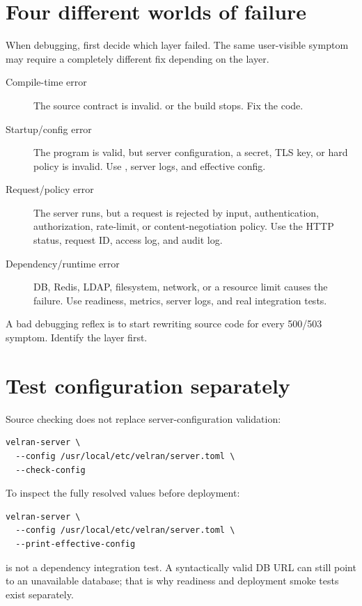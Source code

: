 \section{Four different worlds of failure}

When debugging, first decide which layer failed. The same user-visible symptom may require a completely different fix depending on the layer.

\begin{description}
  \item[Compile-time error] The source contract is invalid.  or the build stops. Fix the code.
  \item[Startup/config error] The program is valid, but server configuration, a secret, TLS key, or hard policy is invalid. Use , server logs, and effective config.
  \item[Request/policy error] The server runs, but a request is rejected by input, authentication, authorization, rate-limit, or content-negotiation policy. Use the HTTP status, request ID, access log, and audit log.
  \item[Dependency/runtime error] DB, Redis, LDAP, filesystem, network, or a resource limit causes the failure. Use readiness, metrics, server logs, and real integration tests.
\end{description}

A bad debugging reflex is to start rewriting source code for every 500/503 symptom. Identify the layer first.

\section{Test configuration separately}

Source checking does not replace server-configuration validation:

\begin{lstlisting}
velran-server \
  --config /usr/local/etc/velran/server.toml \
  --check-config
\end{lstlisting}

To inspect the fully resolved values before deployment:

\begin{lstlisting}
velran-server \
  --config /usr/local/etc/velran/server.toml \
  --print-effective-config
\end{lstlisting}

\code{--check-config} is not a dependency integration test. A syntactically valid DB URL can still point to an unavailable database; that is why readiness and deployment smoke tests exist separately.

